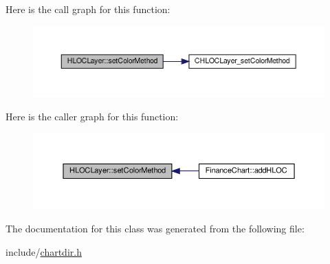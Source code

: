 Here is the call graph for this function\+:
\nopagebreak
\begin{figure}[H]
\begin{center}
\leavevmode
\includegraphics[width=350pt]{class_h_l_o_c_layer_aa7c17220be7b3289bce51d7b02fd6407_cgraph}
\end{center}
\end{figure}
Here is the caller graph for this function\+:
\nopagebreak
\begin{figure}[H]
\begin{center}
\leavevmode
\includegraphics[width=350pt]{class_h_l_o_c_layer_aa7c17220be7b3289bce51d7b02fd6407_icgraph}
\end{center}
\end{figure}


The documentation for this class was generated from the following file\+:\begin{DoxyCompactItemize}
\item 
include/\hyperlink{chartdir_8h}{chartdir.\+h}\end{DoxyCompactItemize}
